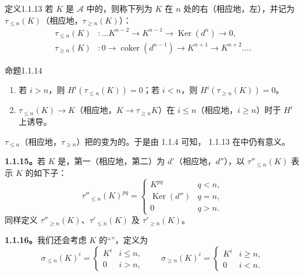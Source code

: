 \begin{SGAresult}{定义}{1.1.13}
若 $K$ 是 $\mathcal A$ 中的，则称下列为 $K$ 在 $n$ 处的右（相应地，左），并记为 $\tau_{\le n}(K)$（相应地，$\tau_{\ge n}(K)$）：
\[
\begin{aligned}
\tau_{\le n}(K)&:\dots K^{n-2}\longrightarrow K^{n-1}\longrightarrow\operatorname{Ker}(d^n)\longrightarrow0,\\
\tau_{\ge n}(K)&:0\longrightarrow\operatorname{coker}(d^{n-1})\longrightarrow K^{n+1}\longrightarrow K^{n+2}\dots.
\end{aligned}
\]
\end{SGAresult}
\begin{SGAresult}{命题}{1.1.14}
\begin{enumerate}
\item[(i)] 若 $i>n$，则 $H^i(\tau_{\le n}(K))=0$；若 $i<n$，则 $H^i(\tau_{\ge n}(K))=0$。
\item[(ii)]  $\tau_{\le n}(K)\to K$（相应地，$K\to\tau_{\ge n}K$）在 $i\le n$（相应地，$i\ge n$）时于 $H^i$ 上诱导。
\end{enumerate}
\end{SGAresult}
 $\tau_{\le n}$（相应地，$\tau_{\ge n}$）把的变为的。于是由 1.1.4 可知， 1.1.13 在中仍有意义。

\textbf{1.1.15。}若 $K$ 是，第一（相应地，第二）为 $d'$（相应地，$d''$），以 $\tau''_{\le n}(K)$ 表示 $K$ 的如下子：
\[
\tau''_{\le n}(K)^{pq}=\begin{cases}
K^{pq}&q<n,\\
\operatorname{Ker}(d'')&q=n,\\
0&q>n.
\end{cases}
\]
同样定义 $\tau''_{\ge n}(K)$、$\tau'_{\le n}(K)$ 及 $\tau'_{\ge n}(K)$。

\textbf{1.1.16。}我们还会考虑 $K$ 的“”，定义为
\[
\sigma_{\le n}(K)^i=\begin{cases}K^i&i\le n,\\0&i>n,\end{cases}
\qquad
\sigma_{\ge n}(K)^i=\begin{cases}K^i&i\ge n,\\0&i<n.\end{cases}
\]

